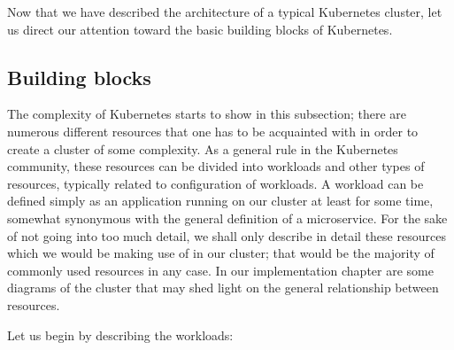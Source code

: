 \documentclass[thesis=B,english]{FITthesis}[2019/12/23]
\begin{document}
Now that we have described the architecture of a typical Kubernetes cluster, let us direct our attention toward the basic building blocks of Kubernetes.

\subsection{Building blocks}

The complexity of Kubernetes starts to show in this subsection; there are numerous different resources that one has to be acquainted with in order to create a cluster of some complexity. As a general rule in the Kubernetes community, these resources can be divided into workloads and other types of resources, typically related to configuration of workloads. A workload can be defined simply as an application running on our cluster at least for some time, somewhat synonymous with the general definition of a microservice. \cite{kube-workloads} For the sake of not going into too much detail, we shall only describe in detail these resources which we would be making use of in our cluster; that would be the majority of commonly used resources in any case. In our implementation chapter are some diagrams of the cluster that may shed light on the general relationship between resources.

Let us begin by describing the workloads:
\end{document}
